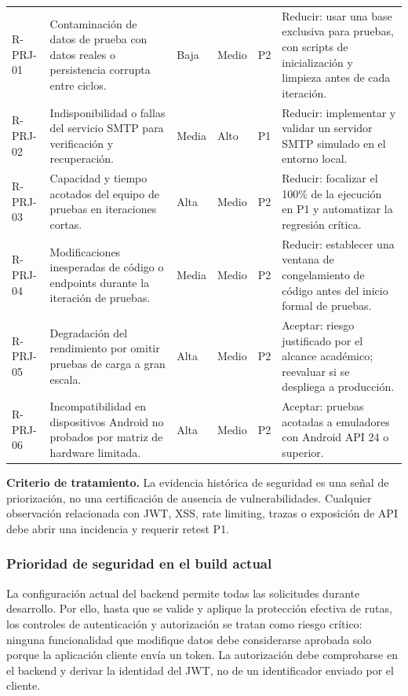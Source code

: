 \documentclass[11pt,a4paper]{article}
\begin{document}
\begin{longtable}{p{0.8cm}p{4.5cm}p{0.8cm}p{0.9cm}p{0.7cm}p{5.0cm}}
\rowcolor{lightgray}R-PRJ-01 & Contaminación de datos de prueba con datos reales o persistencia corrupta entre ciclos. & Baja & Medio & P2 & Reducir: usar una base exclusiva para pruebas, con scripts de inicialización y limpieza antes de cada iteración.\\
R-PRJ-02 & Indisponibilidad o fallas del servicio SMTP para verificación y recuperación. & Media & Alto & P1 & Reducir: implementar y validar un servidor SMTP simulado en el entorno local.\\
\rowcolor{lightgray}R-PRJ-03 & Capacidad y tiempo acotados del equipo de pruebas en iteraciones cortas. & Alta & Medio & P2 & Reducir: focalizar el 100\% de la ejecución en P1 y automatizar la regresión crítica.\\
R-PRJ-04 & Modificaciones inesperadas de código o endpoints durante la iteración de pruebas. & Media & Medio & P2 & Reducir: establecer una ventana de congelamiento de código antes del inicio formal de pruebas.\\
\rowcolor{lightgray}R-PRJ-05 & Degradación del rendimiento por omitir pruebas de carga a gran escala. & Alta & Medio & P2 & Aceptar: riesgo justificado por el alcance académico; reevaluar si se despliega a producción.\\
R-PRJ-06 & Incompatibilidad en dispositivos Android no probados por matriz de hardware limitada. & Alta & Medio & P2 & Aceptar: pruebas acotadas a emuladores con Android API 24 o superior.\\
\end{longtable}
\normalsize

\noindent\textbf{Criterio de tratamiento.} La evidencia histórica de seguridad es una señal de priorización, no una certificación de ausencia de vulnerabilidades. Cualquier observación relacionada con JWT, XSS, rate limiting, trazas o exposición de API debe abrir una incidencia y requerir retest P1.

\subsubsection{Prioridad de seguridad en el build actual}
La configuración actual del backend permite todas las solicitudes durante desarrollo. Por ello, hasta que se valide y aplique la protección efectiva de rutas, los controles de autenticación y autorización se tratan como riesgo crítico: ninguna funcionalidad que modifique datos debe considerarse aprobada solo porque la aplicación cliente envía un token. La autorización debe comprobarse en el backend y derivar la identidad del JWT, no de un identificador enviado por el cliente.
\end{document}
